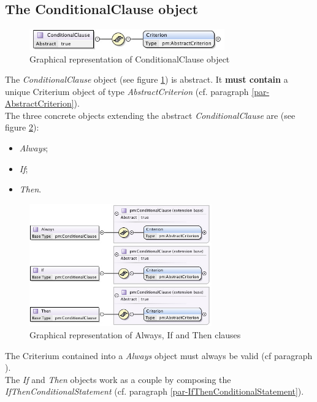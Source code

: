 \documentclass[a4paper,11pt] {article}
\begin{document}
\subsection{The ConditionalClause object}\label{par-ConditionalClause}
\begin{figure}[htbp]
\begin{center}
\includegraphics[width=0.75\textwidth]{pictures/ConditionalClause.jpg} 
\caption{Graphical representation of ConditionalClause object}
\label{Pic-ConditionalClause}
\end{center}
\end{figure}
The {\it ConditionalClause} object (see figure \ref{Pic-ConditionalClause}) is abstract. It {\bf
must contain} a unique Criterium object of type {\it AbstractCriterion} (cf. paragraph
\ref{par-AbstractCriterion}).\\
The three concrete objects extending the abstract {\it ConditionalClause} are (see figure
\ref{Pic-ConcreteClause}):
\begin{itemize}
\item {\it Always};
\item {\it If};
\item {\it Then}.
\end{itemize}
\begin{figure}[htbp]
\begin{center}
\includegraphics[width=0.7\textwidth]{pictures/ConcreteClauses.jpg} 
\caption{Graphical representation of Always, If and Then clauses}
\label{Pic-ConcreteClause}
\end{center}
\end{figure}
The Criterium contained into a {\it Always} object must always be valid (cf paragraph
\label{par-AlwaysConditionalStatement}).\\
The {\it If} and {\it Then} objects work as a couple by composing the  {\it
IfThenConditionalStatement} (cf. paragraph
\ref{par-IfThenConditionalStatement}).
\end{document}
